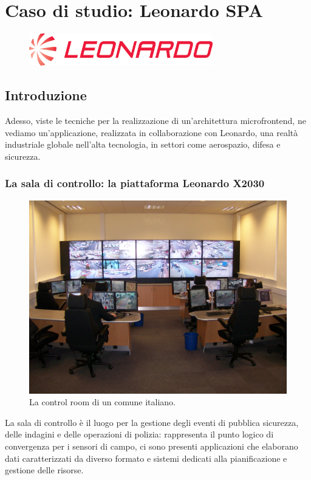 \chapter{Caso di studio: Leonardo SPA}\label{ch:leonardo}

\begin{figure}[H]
    \centering
    \includegraphics[width=80mm]{img/leonardo}
  \end{figure}
\section{Introduzione}

Adesso, viste le tecniche per la realizzazione di un'architettura microfrontend, ne vediamo
un'applicazione, realizzata in collaborazione con Leonardo, una realtà industriale globale 
nell'alta tecnologia, in settori come aerospazio, difesa e sicurezza.

\subsection{La sala di controllo: la piattaforma Leonardo X2030}
\begin{figure}[H]
    \centering
    \includegraphics[width=148mm]{img/control-room.jpeg}
    \caption{La control room di un comune italiano.}
  \end{figure}
La sala di controllo è il luogo per la gestione degli eventi di pubblica sicurezza, delle indagini e
delle operazioni di polizia: rappresenta il punto logico di convergenza per i sensori di campo,
ci sono presenti applicazioni che elaborano dati caratterizzati da diverso formato 
e sistemi dedicati alla pianificazione e gestione delle risorse.
 
